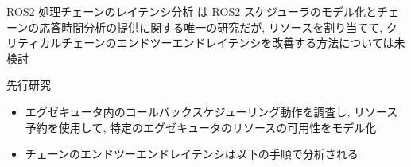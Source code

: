 {    \begin{frame}{ROS2 処理チェーンのレイテンシ分析}
        \cite{casini2019response} は ROS2 スケジューラのモデル化とチェーンの応答時間分析の提供に関する唯一の研究だが, リソースを割り当てて, クリティカルチェーンのエンドツーエンドレイテンシを改善する方法については未検討
        \begin{block}{先行研究 \cite{casini2019response}}
            \setlength{\linewidth}{0.98\columnwidth}
            \setlength{\wideitemsep}{0.8\itemsep}
            {\footnotesize
                \begin{itemize}
                    \item エグゼキュータ内のコールバックスケジューリング動作を調査し, リソース予約を使用して, 特定のエグゼキュータのリソースの可用性をモデル化
                    \item チェーンのエンドツーエンドレイテンシは以下の手順で分析される
                \end{itemize}
            }
        \end{block}
    \end{frame}
}
